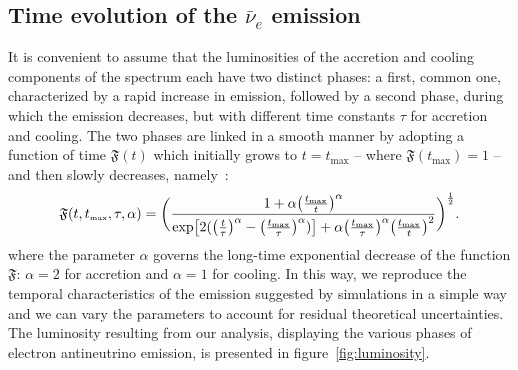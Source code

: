 \documentclass[a4paper,11pt]{article}
\begin{document}
\subsection{Time evolution of the $\bar \nu_e$ emission}
It is convenient to assume that the luminosities of the accretion and cooling components of the spectrum each have two distinct phases: a   first, common one, characterized by a rapid increase in emission,  followed by a second phase, during which the emission decreases, but  with different time constants $\tau$ for  accretion and cooling.
The two phases are linked in a smooth manner by adopting a function of time $\mathfrak{F}(t)$ which initially grows to $t=t_{\text{max}}$ -- where 
$\mathfrak{F}(t_{\text{max}})=1$ -- 
and then slowly decreases, %
 namely~\cite{sym13101851}:
\begin{equation}\label{eq:Fcalligrafica}
  \mathfrak{F}  (t, t_{\mbox{\tiny max}}, \tau, \alpha)=\bigg(\frac{1+\alpha\big(\frac{t_{\mbox{\tiny max}}}{t}\big)^{\alpha}}{\exp[2(\big(\frac{t}{\tau}\big)^\alpha-\big(\frac{t_{\mbox{\tiny max}}}{\tau}\big)^{\alpha})]+\alpha \big(\frac{t_{\mbox{\tiny max}}}{\tau}\big)^{\alpha}\big(\frac{t_{\mbox{\tiny max}}}{t}\big)^2}\bigg)^{\frac{1}{2}}.
\end{equation}
%
where the parameter $\alpha$ governs the long-time exponential decrease of the function $\mathfrak{F}$:  $\alpha=2$ for accretion and $\alpha=1$ for cooling.
In this way, we reproduce the temporal characteristics of the emission suggested by simulations in a simple way and we can vary the parameters to account for residual theoretical uncertainties.
The  luminosity resulting from our analysis,  displaying the various phases of electron antineutrino emission, is presented in figure~\ref{fig:luminosity}.
\end{document}
